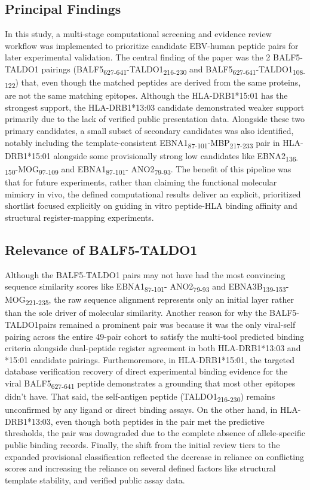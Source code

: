\documentclass[11pt]{article}
\begin{document}
\subsection{Principal Findings}
In this study, a multi-stage computational screening and evidence review workflow was implemented to prioritize candidate EBV-human peptide pairs for later experimental validation. The central finding of the paper was the 2 BALF5-TALDO1 pairings (BALF5\textsubscript{627-641}-TALDO1\textsubscript{216-230} and BALF5\textsubscript{627-641}-TALDO1\textsubscript{108-122}) that, even though the matched peptides are derived from the same proteins, are not the same matching epitopes. Although the HLA-DRB1*15:01 has the strongest support, the HLA-DRB1*13:03 candidate demonstrated weaker support primarily due to the lack of verified public presentation data. Alongside these two primary candidates, a small subset of secondary candidates was also identified, notably including the template-consistent EBNA1\textsubscript{87-101}-MBP\textsubscript{217-233} pair in HLA-DRB1*15:01 alongside some provisionally strong low candidates like EBNA2\textsubscript{136-150}-MOG\textsubscript{97-109} and EBNA1\textsubscript{87-101}- ANO2\textsubscript{79-93}. The benefit of this pipeline was that for future experiments, rather than claiming the functional molecular mimicry in vivo, the defined computational results deliver an explicit, prioritized shortlist focused explicitly on guiding in vitro peptide-HLA binding affinity and structural register-mapping experiments.

\subsection{Relevance of BALF5-TALDO1}
Although the BALF5-TALDO1 pairs may not have had the most convincing sequence similarity scores like EBNA1\textsubscript{87-101}- ANO2\textsubscript{79-93} and EBNA3B\textsubscript{139-153}-MOG\textsubscript{221-235}, the raw sequence alignment represents only an initial layer rather than the sole driver of molecular similarity. Another reason for why the BALF5-TALDO1pairs remained a prominent pair was because it was the only viral-self pairing across the entire 49-pair cohort to satisfy the multi-tool predicted binding criteria alongside dual-peptide register agreement in both HLA-DRB1*13:03 and *15:01 candidate pairings. Furthemoremore, in HLA-DRB1*15:01, the targeted database verification recovery of direct experimental binding evidence for the viral BALF5\textsubscript{627-641} peptide demonstrates a grounding that most other epitopes didn’t have. That said, the self-antigen peptide (TALDO1\textsubscript{216-230}) remains unconfirmed by any ligand or direct binding assays. On the other hand, in HLA-DRB1*13:03, even though both peptides in the pair met the predictive thresholds, the pair was downgraded due to the complete absence of allele-specific public binding records. Finally, the shift from the initial review tiers to the expanded provisional classification reflected the decrease in reliance on conflicting scores and increasing the reliance on several defined factors like structural template stability, and verified public assay data.
\end{document}
